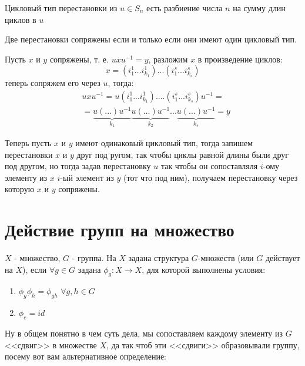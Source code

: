 \begin{Def}
Цикловый тип перестановки из $u \in S_n$ есть разбиение числа $n$ на сумму длин циклов в $u$
\end{Def}

\begin{Th}
Две перестановки сопряжены если и только если они имеют один цикловый тип.
\end{Th}

\begin{Proof}
Пусть $x$ и $y$ сопряжены, т. е. $u x u^{-1} = y$, разложим $x$ в произведение циклов:
\[
	x = \left(i_1^{1}...i_{k_1}^1\right)...\left(i_1^s...i_{k_s}^s\right)
\]
теперь сопряжем его через $u$, тогда:
\[
	\begin{split}
		&u x u^{-1} = u \left(i_1^1...i_{k_1}^1\right)....\left(i_1^s...i_{k_s}^s\right) u^{-1} = \\
		& = \underbrace{u \left(...\right) u^{-1}}_{k_1} \underbrace{u \left(...\right) u^{-1}}_{k_2} ... \underbrace{u \left(...\right) u^{-1}}_{k_s} = y
	\end{split}
\]

Теперь пусть $x$ и $y$ имеют одинаковый цикловый тип, тогда запишем перестановки $x$ и $y$ друг под ругом, так чтобы циклы равной длины были друг под другом, но тогда задав перестановку $u$ так чтобы он сопоставляля $i$-ому элементу из $x$ $i$-ый элемент из $y$ (тот что под ним), получаем перестановку через которую $x$ и $y$ сопряжены.
\end{Proof}

\section{Действие групп на множество}

\begin{Def}
$X$ - множество, $G$ - группа. На $X$ задана структура $G$-множеств (или $G$ действует на $X$), если $\forall g \in G$ задана $\phi_g : X \rightarrow X$, для которой выполнены условия:
\begin{enumerate}
\item $\phi_g \phi_h = \phi_{gh}$ $\forall g,h \in G$

\item $\phi_e = id$
\end{enumerate}
\end{Def}
Ну в общем понятно в чем суть дела, мы сопоставляем каждому элементу из $G$ <<сдвиг>> в множестве $X$, да так чтоб эти <<сдвиги>> образовывали группу, посему вот вам альтернативное определение:

